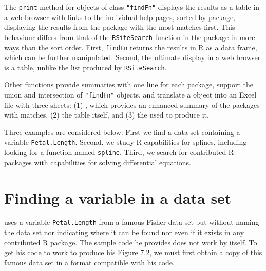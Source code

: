 \documentclass[a4paper]{report}
\begin{document}
\begin{article}
The {\tt print} method for objects of class {\tt "findFn"}
displays the results as a table in a web
browser with links to the individual help pages, sorted by package,
displaying the results from the package with the most matches first.  This
behaviour differs from that of the {\tt RSiteSearch} function in the
 package in more ways than the sort order.  First, {\tt findFn}
returns the results in R as a data frame, which can be further
manipulated.  Second, the ultimate display in a web browser is a
table, unlike the list produced by {\tt RSiteSearch}.

Other  functions provide summaries with one line for each
package, support the union and intersection of {\tt "findFn"} objects,
and translate a  object into an Excel file with three sheets:
(1) , which provides an enhanced summary of the packages
with matches, (2) the  table itself, and (3) the 
used to produce it.

Three examples are considered below:  First we find a data set
containing a variable {\tt Petal.Length}. Second, we study
R capabilities for splines, including looking for a function
named {\tt spline}.  Third, we search for contributed R packages
 with capabilities for solving differential equations.

\section{Finding a variable in a data set}

\citet[pp. 282-283]{JC09} uses a variable {\tt Petal.Length} from a
famous Fisher data set but without naming the data set nor indicating
where it can be found nor even if it exists in any contributed R
package.  The sample code he provides does not work by itself.  To get
his code to  work to produce his Figure 7.2, we must first obtain a
copy of this famous data set in a format compatible with his code.


\end{article}
\end{document}
